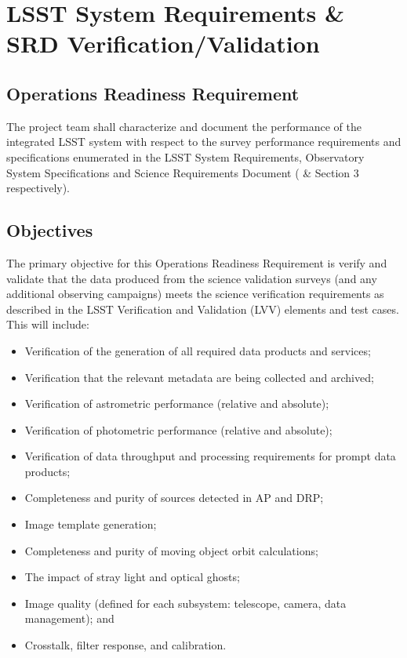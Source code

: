 \section{LSST System Requirements \& SRD Verification/Validation}  \label{sec:srd}

\subsection{Operations Readiness Requirement}
The project team shall characterize and document the performance of the integrated LSST system with respect to the survey performance requirements and specifications enumerated in the LSST System Requirements, Observatory System Specifications and Science Requirements Document ( \&  Section 3 respectively).

\subsection{Objectives}

The primary objective for this Operations Readiness Requirement is verify and validate that the data produced from the science validation surveys (and any additional observing campaigns) meets the science verification requirements as described in the LSST Verification and Validation (LVV) elements and test cases. This will include:

\begin{itemize}
	\item Verification of the generation of all required data products and services;
 	\item Verification that the relevant metadata are being collected and archived;
	\item Verification of astrometric performance (relative and absolute);
	\item Verification of photometric performance (relative and absolute);
	\item Verification of data throughput and processing requirements for prompt data products;  
	\item Completeness and purity of sources detected in AP and DRP;
	\item Image template generation;
	\item Completeness and purity of moving object orbit calculations;
	\item The impact of stray light and optical ghosts;
	\item Image quality (defined for each subsystem: telescope, camera, data management); and
	\item Crosstalk, filter response, and calibration.	
\end{itemize}

